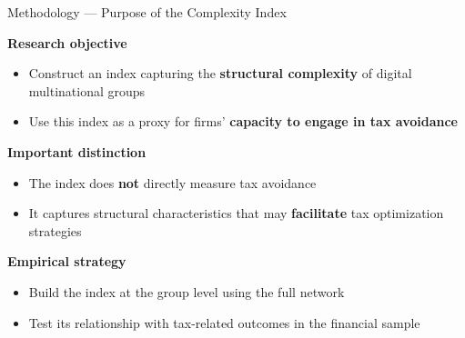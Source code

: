 \documentclass[11pt,aspectratio=169]{beamer}
\begin{document}
  \begin{frame}{Methodology --- Purpose of the Complexity Index}
  
  \textbf{Research objective}
  
  \begin{itemize}
      \item Construct an index capturing the \textbf{structural complexity} of digital multinational groups
      \item Use this index as a proxy for firms' \textbf{capacity to engage in tax avoidance}
  \end{itemize}
  
  \medskip
  
  \textbf{Important distinction}
  
  \begin{itemize}
      \item The index does \textbf{not} directly measure tax avoidance
      \item It captures structural characteristics that may \textbf{facilitate} tax optimization strategies
  \end{itemize}
  
  \medskip
  
  \textbf{Empirical strategy}
  
  \begin{itemize}
      \item Build the index at the group level using the full network
      \item Test its relationship with tax-related outcomes in the financial sample
  \end{itemize}
  
  \end{frame}
  
\end{document}
